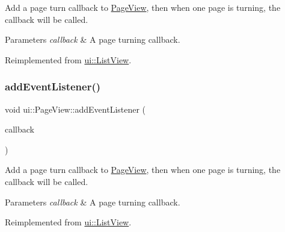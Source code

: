 Add a page turn callback to \hyperlink{classui_1_1PageView}{Page\+View}, then when one page is turning, the callback will be called. 


\begin{DoxyParams}{Parameters}
{\em callback} & A page turning callback. \\
\hline
\end{DoxyParams}


Reimplemented from \hyperlink{classui_1_1ListView_ac9579703c37e0c23eba035fe31e00ba5}{ui\+::\+List\+View}.

\mbox{\label{classui_1_1PageView_a8887593dc71c203af06f8043082d2de4}} 
\subsubsection{\texorpdfstring{add\+Event\+Listener()}{addEventListener()}\hspace{0.1cm}{\footnotesize\ttfamily [2/2]}}
{\footnotesize\ttfamily void ui\+::\+Page\+View\+::add\+Event\+Listener (\begin{DoxyParamCaption}\item[{const \hyperlink{classui_1_1PageView_a1cbaf2e41005380574beae96ac2bc136}{cc\+Page\+View\+Callback} \&}]{callback }\end{DoxyParamCaption})\hspace{0.3cm}{\ttfamily [virtual]}}



Add a page turn callback to \hyperlink{classui_1_1PageView}{Page\+View}, then when one page is turning, the callback will be called. 


\begin{DoxyParams}{Parameters}
{\em callback} & A page turning callback. \\
\hline
\end{DoxyParams}


Reimplemented from \hyperlink{classui_1_1ListView_ac9579703c37e0c23eba035fe31e00ba5}{ui\+::\+List\+View}.

\mbox{\label{classui_1_1PageView_a67ca3d93ecbad57aa9ba3d5df1350dbd}} 
